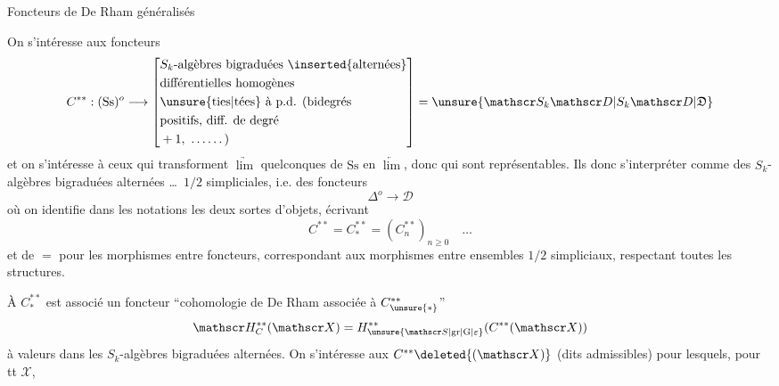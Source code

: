 \begin{center}Foncteurs de De Rham généralisés\end{center}
On s'intéresse aux foncteurs
\[
 C^{**}:(\mathrm{Ss})^{o}\longrightarrow
 \left[\begin{aligned}
 &S_k\text{-algèbres bigraduées \inserted{alternées}}\\
 &\text{différentielles homogènes}\\
 &\text{\unsure{ties|tées} à p.d. (bidegrés}\\
 &\text{positifs, diff. de degré}\\
 &+1,\ \ldots\ldots\,)
 \end{aligned}\right]=\unsure{\mathscr S_k\mathscr D|S_k\mathscr D|\mathfrak D}
\]
et on s'intéresse à ceux qui transforment $\underrightarrow{\lim}$ quelconques de $\mathrm{Ss}$ en $\underleftarrow{\lim}$, donc qui sont représentables.
Ils   donc s'interpréter  comme des $S_k$-algèbres bigraduées alternées \ldots\ $1/2$ simpliciales, i.e. des foncteurs
\[
 \mathbb{\Delta}^{o}\longrightarrow\mathscr D
\]
où on identifie dans les notations les deux sortes d'objets, écrivant 
\[
 C^{**}=C_*^{**}=(C_n^{**})_{n\geq 0}\quad\ldots
\]
et de $=$ pour les morphismes entre foncteurs, correspondant aux morphismes entre ensembles $1/2$ simpliciaux, respectant toutes les structures.

À $C_*^{**}$ est associé un foncteur ``cohomologie de De Rham associée à $C_{\unsure{*}}^{**}$''
\[
 \mathscr H_C^{**}(\mathscr X)=H_{\unsure{\mathscr S|\mathrm{gr}|\mathrm{G}|\varepsilon}}^{**}(C^{**}(\mathscr X))
\]
à valeurs dans les $S_k$-algèbres bigraduées alternées. On s'intéresse aux $C^{**}\deleted{(\mathscr X)}$ (dits admissibles) pour lesquels, pour tt $\mathscr X$,
